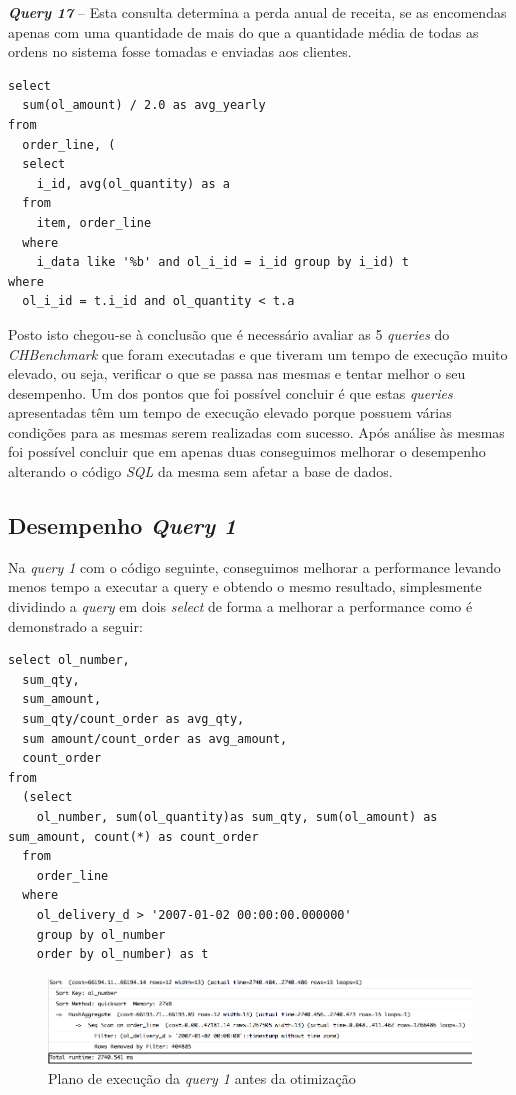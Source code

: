 \textbf{\textit{Query 17}} – Esta consulta determina a perda anual de receita, se as encomendas apenas com uma quantidade de mais do que a quantidade média de todas as ordens no sistema fosse tomadas e enviadas aos clientes.

\begin{verbatim}
select
  sum(ol_amount) / 2.0 as avg_yearly
from
  order_line, (
  select
    i_id, avg(ol_quantity) as a
  from
    item, order_line
  where
    i_data like '%b' and ol_i_id = i_id group by i_id) t
where
  ol_i_id = t.i_id and ol_quantity < t.a
\end{verbatim}


Posto isto chegou-se à conclusão que é necessário avaliar as 5 \textit{queries} do \textit{CHBenchmark} que foram executadas e que tiveram um tempo de execução muito elevado, ou seja, verificar o que se passa nas mesmas e tentar melhor o seu desempenho. Um dos pontos que foi possível concluir é que estas \textit{queries} apresentadas têm um tempo de execução elevado porque possuem várias condições para as mesmas serem realizadas com sucesso. Após análise às mesmas foi possível concluir que em apenas duas conseguimos melhorar o desempenho alterando o código \textit{SQL} da mesma sem afetar a base de dados.\\

\newpage

\subsection{Desempenho \textit{Query 1}}

Na \textit{query 1} com o código seguinte, conseguimos melhorar a performance levando menos tempo a executar a query e obtendo o mesmo resultado, simplesmente dividindo a \textit{query} em dois \textit{select} de forma a melhorar a performance como é demonstrado a seguir:

\begin{verbatim}
select ol_number,
  sum_qty,
  sum_amount,
  sum_qty/count_order as avg_qty,
  sum amount/count_order as avg_amount,
  count_order
from
  (select
    ol_number, sum(ol_quantity)as sum_qty, sum(ol_amount) as sum_amount, count(*) as count_order
  from
    order_line
  where
    ol_delivery_d > '2007-01-02 00:00:00.000000'
    group by ol_number
    order by ol_number) as t
\end{verbatim}

\begin{figure}[ht!]
\centering
\includegraphics[width=\textwidth]{img/00_query1_pos}
\caption{Plano de execução da \textit{query 1} antes da otimização \label{overflow}}
\end{figure}

